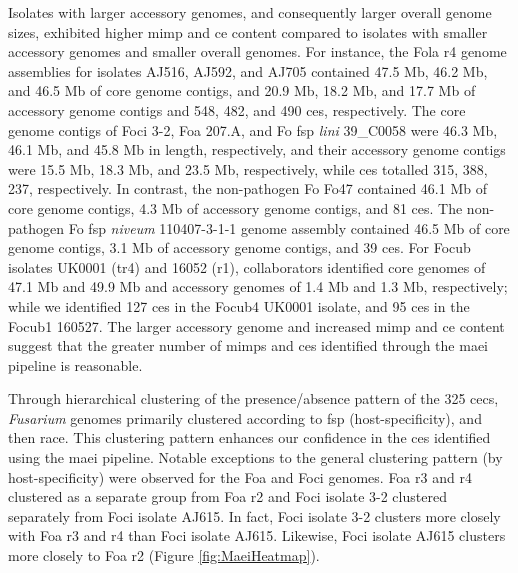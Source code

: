 Isolates with larger accessory genomes, and consequently larger overall genome sizes, exhibited higher \ac{mimp} and \ac{ce} content compared to isolates with smaller accessory genomes and smaller overall genomes. For instance, the \ac{Fola} \ac{r4} genome assemblies for isolates AJ516, AJ592, and AJ705 contained 47.5 Mb, 46.2 Mb, and 46.5 Mb of core genome contigs, and 20.9 Mb, 18.2 Mb, and 17.7 Mb of accessory genome contigs and 548, 482, and 490 \acp{ce}, respectively. The core genome contigs of \ac{Foci} 3-2, \ac{Foa} 207.A, and \ac{Fo} \ac{fsp} \textit{lini} 39\_C0058 were 46.3 Mb, 46.1 Mb, and 45.8 Mb in length, respectively, and their accessory genome contigs were 15.5 Mb, 18.3 Mb, and 23.5 Mb, respectively, while \acp{ce} totalled 315, 388, 237, respectively. In contrast, the non-pathogen \ac{Fo} Fo47 contained 46.1 Mb of core genome contigs, 4.3 Mb of accessory genome contigs, and 81 \acp{ce}. The non-pathogen \ac{Fo} \ac{fsp} \textit{niveum} 110407-3-1-1 genome assembly contained 46.5 Mb of core genome contigs, 3.1 Mb of accessory genome contigs, and 39 \acp{ce}. For \ac{Focub} isolates UK0001 (\ac{tr4}) and 16052 (\ac{r1}), collaborators identified core genomes of 47.1 Mb and 49.9 Mb and accessory genomes of 1.4 Mb and 1.3 Mb, respectively; while we identified 127 \acp{ce} in the \ac{Focub4} UK0001 isolate, and 95 \acp{ce} in the \ac{Focub1} 160527. The larger accessory genome and increased \ac{mimp} and \ac{ce} content suggest that the greater number of \acp{mimp} and \acp{ce} identified through the \ac{maei} pipeline is reasonable.

\bigskip
\noindent
Through hierarchical clustering of the presence/absence pattern of the 325 \acp{cec}, \textit{Fusarium} genomes primarily clustered according to \ac{fsp} (host-specificity), and then race. This clustering pattern enhances our confidence in the \acp{ce} identified using the \ac{maei} pipeline. Notable exceptions to the general clustering pattern (by host-specificity) were observed for the \ac{Foa} and \ac{Foci} genomes. \ac{Foa} \ac{r3} and \ac{r4} clustered as a separate group from \ac{Foa} \ac{r2} and \ac{Foci} isolate 3-2 clustered separately from \ac{Foci} isolate AJ615. In fact, \ac{Foci} isolate 3-2 clusters more closely with \ac{Foa} \ac{r3} and \ac{r4} than \ac{Foci} isolate AJ615. Likewise, \ac{Foci} isolate AJ615 clusters more closely to \ac{Foa} \ac{r2} (Figure \ref{fig:MaeiHeatmap}). 

